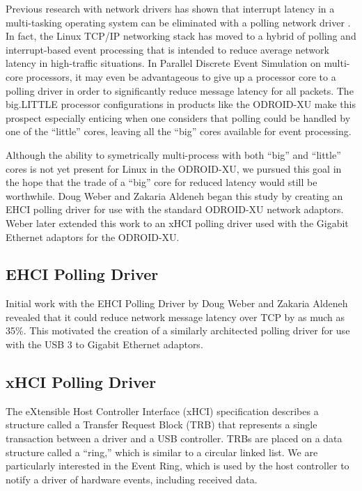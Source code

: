 \documentclass[11pt]{book}
\begin{document}
Previous research with network drivers has shown that interrupt latency in a
multi-tasking operating system can be eliminated with a polling network driver
\cite{dovrolis-01}\cite{liu-09}. In fact, the Linux TCP/IP networking stack has
moved to a hybrid of polling and interrupt-based event processing that is
intended to reduce average network latency in high-traffic situations. In
Parallel Discrete Event Simulation on multi-core processors, it may even be
advantageous to give up a processor core to a polling driver in order to
significantly reduce message latency for all packets. The big.LITTLE processor
configurations in products like the ODROID-XU make this prospect especially
enticing when one considers that polling could be handled by one of the
``little'' cores, leaving all the ``big'' cores available for event processing.

Although the ability to symetrically multi-process with both ``big'' and
``little'' cores is not yet present for Linux in the ODROID-XU, we pursued this
goal in the hope that the trade of a ``big'' core for reduced latency would
still be worthwhile. Doug Weber and Zakaria Aldeneh began this study by creating
an EHCI polling driver for use with the standard ODROID-XU network
adaptors. Weber later extended this work to an xHCI polling driver used
with the Gigabit Ethernet adaptors for the ODROID-XU.

\subsection{\textbf{EHCI Polling Driver}}

Initial work with the EHCI Polling Driver by Doug Weber and Zakaria Aldeneh
revealed that it could reduce network message latency over TCP by as much as
35\%. This motivated the creation of a similarly architected polling driver
for use with the USB 3 to Gigabit Ethernet adaptors.

\subsection{\textbf{xHCI Polling Driver}}

The eXtensible Host Controller Interface (xHCI) specification \cite{xhci}
describes a structure called a Transfer Request Block (TRB) that represents a
single transaction between a driver and a USB controller. TRBs are placed on a
data structure called a ``ring,'' which is similar to a circular linked list. We
are particularly interested in the Event Ring, which is used by the host
controller to notify a driver of hardware events, including received data.
\end{document}
